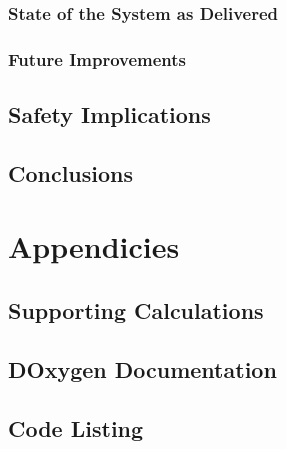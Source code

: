 \documentclass[10pt,a4paper]{report}
\begin{document}
\section{State of the System as Delivered}
\section{Future Improvements}

\chapter{Safety Implications}

\chapter{Conclusions}

\part{Appendicies}

\chapter{Supporting Calculations}

\chapter{DOxygen Documentation}

\chapter{Code Listing}
\end{document}
